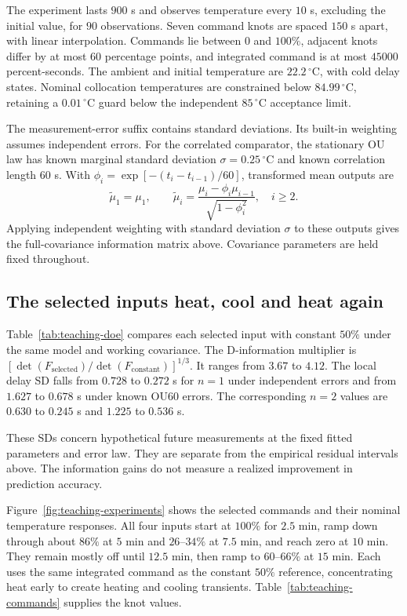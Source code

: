 The experiment lasts $900$ s and observes temperature every $10$ s, excluding
the initial value, for $90$ observations. Seven command knots are spaced
$150$ s apart, with linear interpolation. Commands lie between $0$ and $100\%$,
adjacent knots differ by at most $60$ percentage points, and integrated command
is at most $45000$ percent-seconds. The ambient and initial temperature are
$22.2\,{}^\circ\mathrm C$, with cold delay states. Nominal collocation
temperatures are constrained below $84.99\,{}^\circ\mathrm C$, retaining a
$0.01\,{}^\circ\mathrm C$ guard below the independent $85\,{}^\circ\mathrm C$
acceptance limit.

The measurement-error suffix contains standard deviations. Its built-in
weighting assumes independent errors. For the correlated comparator, the
stationary OU law has known marginal standard deviation
$\sigma=0.25\,{}^\circ\mathrm C$ and known correlation length $60$ s.
With $\phi_i=\exp[-(t_i-t_{i-1})/60]$, transformed mean outputs are
\begin{equation}
 \widetilde\mu_1=\mu_1,\qquad
 \widetilde\mu_i=\frac{\mu_i-\phi_i\mu_{i-1}}{\sqrt{1-\phi_i^2}},
 \quad i\geq2.
\end{equation}
Applying independent weighting with standard deviation $\sigma$ to these
outputs gives the full-covariance information matrix above. Covariance
parameters are held fixed throughout.

\subsection{The selected inputs heat, cool and heat again}
Table~\ref{tab:teaching-doe} compares each selected input with constant $50\%$
under the same model and working covariance. The D-information multiplier is
$[\det(F_{\mathrm{selected}})/\det(F_{\mathrm{constant}})]^{1/3}$.
It ranges from $3.67$ to $4.12$. The local delay SD falls from
$0.728$ to $0.272$ s for $n=1$ under independent errors and from
$1.627$ to $0.678$ s under known OU60 errors. The corresponding $n=2$ values
are $0.630$ to $0.245$ s and $1.225$ to $0.536$ s.


These SDs concern hypothetical future measurements at the fixed fitted
parameters and error law. They are separate from the empirical residual
intervals above. The information gains do not measure a realized improvement
in prediction accuracy.

Figure~\ref{fig:teaching-experiments} shows the selected commands and their
nominal temperature responses. All four inputs start at $100\%$ for $2.5$ min,
ramp down through about $86\%$ at $5$ min and $26$--$34\%$ at $7.5$ min,
and reach zero at $10$ min. They remain mostly off until $12.5$ min, then ramp
to $60$--$66\%$ at $15$ min. Each uses the same integrated command as the
constant $50\%$ reference, concentrating heat early to create heating and
cooling transients. Table~\ref{tab:teaching-commands} supplies the knot values.

